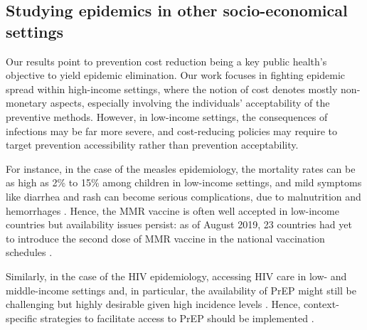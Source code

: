 

\subsection{Studying epidemics in other socio-economical settings}
Our results point to prevention cost reduction being a key public health's objective to yield epidemic elimination. Our work focuses in fighting epidemic spread within high-income settings, where the notion of cost denotes mostly non-monetary aspects, especially involving the individuals' acceptability of the preventive methods. However, in low-income settings, the consequences of infections may be far more severe, and cost-reducing policies may require to target prevention accessibility rather than prevention acceptability. 

For instance, in the case of the measles epidemiology, the mortality rates can be as high as 2\% to 15\% among children in low-income settings, and mild symptoms like diarrhea and rash can become serious complications, due to malnutrition and hemorrhages \cite[]{Sever2011}. Hence, the MMR vaccine is often well accepted in low-income countries \cite[]{Larson2016} but availability issues persist: as of August 2019, 23 countries had yet to introduce the second dose of MMR vaccine in the national vaccination schedules \cite[]{WHO_MeaslesWW2019}. 

Similarly, in the case of the HIV epidemiology, accessing HIV care in low- and middle-income settings and, in particular, the availability of PrEP might still be challenging but highly desirable given high incidence levels \cite[]{UNAIDS_Data2019}. Hence, context-specific strategies to facilitate access to PrEP should be implemented \cite[]{Rebe2019}. 

